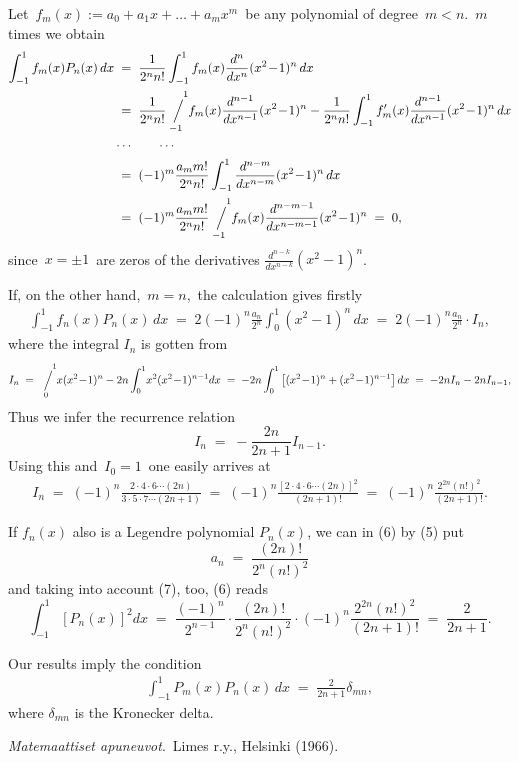 \documentclass[12pt]{article}
\newcommand{\sijoitus}[2]%
{\operatornamewithlimits{\Big/}_{\!\!\!#1}^{\,#2}}
\begin{document}
Let\, $f_m(x) := a_0\!+\!a_1x\!+\ldots+\!a_mx^m$\, be any polynomial of degree\, $m < n$.\,  $m$ times we obtain
\begin{align*}
\int_{-1}^1f_m(x)P_n(x)\,dx & \;=\; \frac{1}{2^nn!}\int_{-1}^1f_m(x)\frac{d^n}{dx^n}(x^2\!-\!1)^n\,dx \\
& \;=\; \frac{1}{2^nn!}\sijoitus{-1}{\quad 1}\!f_m(x)\frac{d^{n-1}}{dx^{n-1}}(x^2\!-\!1)^n
-\frac{1}{2^nn!}\int_{-1}^1f'_m(x)\frac{d^{n-1}}{dx^{n-1}}(x^2\!-\!1)^n\,dx\\
& \cdots \qquad \cdots\\
& \;=\; (-1)^m\frac{a_mm!}{2^nn!}\int_{-1}^1\frac{d^{n-m}}{dx^{n-m}}(x^2\!-\!1)^n\,dx\\
& \;=\; (-1)^m\frac{a_mm!}{2^nn!}\sijoitus{-1}{\quad1}\!f_m(x)\frac{d^{n-m-1}}{dx^{n-m-1}}(x^2\!-\!1)^n \;=\; 0,
\end{align*}
since\, $x = \pm1$\, are zeros of the derivatives $\frac{d^{n-k}}{dx^{n-k}}(x^2\!-\!1)^n$.

If, on the other hand,\, $m = n$,\, the calculation gives firstly
\begin{align}
\int_{-1}^1f_n(x)P_n(x)\,dx \;=\; 2(-1)^n\frac{a_n}{2^n}\int_0^1(x^2\!-\!1)^n\,dx 
\;=\; 2(-1)^n\frac{a_n}{2^n}\cdot I_n,
\end{align}
where the integral $I_n$ is gotten from
$$I_n \;=\; \sijoitus{0}{\quad 1}\!x(x^2\!-\!1)^n-2n\int_0^1\!x^2(x^2\!-\!1)^{n-1}dx
\;=\; -2n\int_0^1\left[(x^2\!-\!1)^n+(x^2\!-\!1)^{n-1}\right]dx \;=\; -2nI_n-2nI_{n-1},$$
Thus we infer the recurrence relation
$$I_n \;=\; -\frac{2n}{2n\!+\!1}I_{n-1}.$$
Using this and\, $I_0 = 1$\, one easily arrives at
\begin{align}
I_n \;=\; (-1)^n\frac{2\cdot4\cdot6\cdots(2n)}{3\cdot5\cdot7\cdots(2n\!+\!1)}
\;=\; (-1)^n\frac{[2\cdot4\cdot6\cdots(2n)]^2}{(2n\!+\!1)!}
\;=\; (-1)^n\frac{2^{2n}(n!)^2}{(2n\!+\!1)!}.
\end{align}


If $f_n(x)$ also is a Legendre polynomial $P_n(x)$, we can in (6) by (5) put
$$a_n \;=\; \frac{(2n)!}{2^n(n!)^2}$$
and taking into account (7), too, (6) reads
$$\int_{-1}^1\left[P_n(x)\right]^2dx \;=\; 
\frac{(-1)^n}{2^{n-1}}\cdot\frac{(2n)!}{2^n(n!)^2}\cdot(-1)^n\frac{2^{2n}(n!)^2}{(2n\!+\!1)!}
\;=\; \frac{2}{2n\!+\!1}.$$

Our results imply the  condition
\begin{align}
\int_{-1}^1\!P_m(x)P_n(x)\,dx \;=\; \frac{2}{2n\!+\!1}\delta_{mn},
\end{align}
where $\delta_{mn}$ is the Kronecker delta.

\begin{thebibliography}{9}
 {\em Matemaattiset apuneuvot}.\, Limes r.y., Helsinki (1966).
\end{thebibliography}

\end{document}
